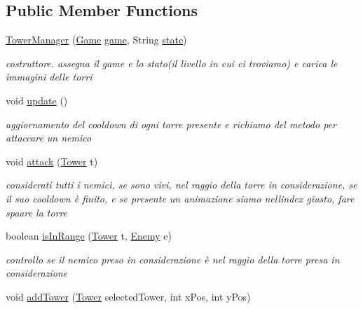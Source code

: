 \subsection*{Public Member Functions}
\begin{DoxyCompactItemize}
\item 
\hyperlink{classmanagers_1_1_tower_manager_a520c6411e4fe9307be91f5a8c7d8b774}{Tower\+Manager} (\hyperlink{classprogetto_1_1_game}{Game} \hyperlink{classmanagers_1_1_tower_manager_ac6a5ed6191fcf3a5bf0445921feb4f48}{game}, String \hyperlink{classmanagers_1_1_tower_manager_a91ac952876f776b3fbbc8519e093fdbf}{state})
\begin{DoxyCompactList}\small\item\em costruttore. assegna il game e lo stato(il livello in cui ci troviamo) e carica le immagini delle torri \end{DoxyCompactList}\item 
void \hyperlink{classmanagers_1_1_tower_manager_ac5c54df7ed3b930268c8d7752c101725}{update} ()
\begin{DoxyCompactList}\small\item\em aggiornamento del cooldown di ogni torre presente e richiamo del metodo per attaccare un nemico \end{DoxyCompactList}\item 
void \hyperlink{classmanagers_1_1_tower_manager_a337d987717311ab51a124a11a059f66c}{attack} (\hyperlink{classtowers_1_1_tower}{Tower} t)
\begin{DoxyCompactList}\small\item\em considerati tutti i nemici, se sono vivi, nel raggio della torre in considerazione, se il suo cooldown è finito, e se presente un animazione siamo nell\textquotesingle{}index giusto, fare spaare la torre \end{DoxyCompactList}\item 
boolean \hyperlink{classmanagers_1_1_tower_manager_a5f1dea7776d18a6f69428e43c4845fdb}{is\+In\+Range} (\hyperlink{classtowers_1_1_tower}{Tower} t, \hyperlink{classenemies_1_1_enemy}{Enemy} e)
\begin{DoxyCompactList}\small\item\em controllo se il nemico preso in considerazione è nel raggio della torre presa in considerazione \end{DoxyCompactList}\item 
void \hyperlink{classmanagers_1_1_tower_manager_a245f3270a9250216ec446114a8cdd805}{add\+Tower} (\hyperlink{classtowers_1_1_tower}{Tower} selected\+Tower, int x\+Pos, int y\+Pos)

\end{DoxyCompactItemize}
